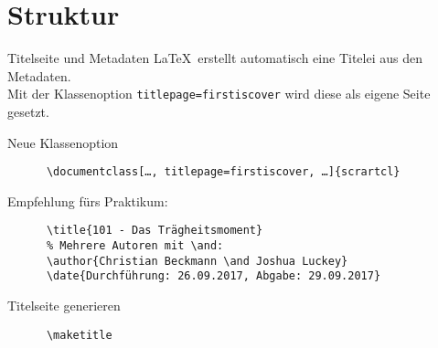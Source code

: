\section{Struktur}

\begin{frame}[fragile]{Titelseite und Metadaten}
  \LaTeX\ erstellt automatisch eine Titelei aus den Metadaten. \\
  Mit der Klassenoption \texttt{titlepage=firstiscover} wird diese  als eigene Seite gesetzt.

  \begin{block}{Neue Klassenoption}
    \begin{verbatim}
      \documentclass[…, titlepage=firstiscover, …]{scrartcl}
    \end{verbatim}
  \end{block}

  \begin{block}{Empfehlung fürs Praktikum:}
    \begin{verbatim}
      \title{101 - Das Trägheitsmoment}
      % Mehrere Autoren mit \and:
      \author{Christian Beckmann \and Joshua Luckey}
      \date{Durchführung: 26.09.2017, Abgabe: 29.09.2017}
    \end{verbatim}
  \end{block}

  \begin{block}{Titelseite generieren}
    \begin{verbatim}
      \maketitle
    \end{verbatim}
  \end{block}
\end{frame}

